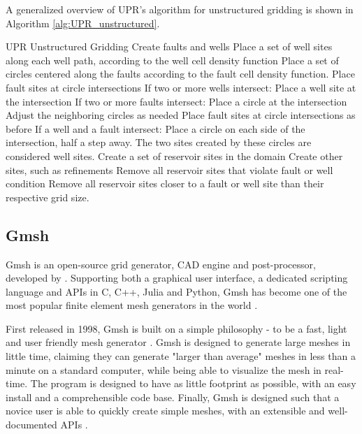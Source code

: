 A generalized overview of UPR's algorithm for unstructured gridding \cite[pp.51]{UPR_thesis} is shown in Algorithm \ref{alg:UPR_unstructured}.
\begin{pseudocode}[float=ht,label=alg:UPR_unstructured]{UPR Unstructured Gridding}
Create faults and wells
    Place a set of well sites along each well path, according to the well cell density function
    Place a set of circles centered along the faults according to the fault cell density function. Place fault sites at circle intersections
    If two or more wells intersect:
        Place a well site at the intersection
    If two or more faults intersect:
        Place a circle at the intersection
        Adjust the neighboring circles as needed
        Place fault sites at circle intersections as before
    If a well and a fault intersect:
        Place a circle on each side of the intersection, half a step away. The two sites created by these circles are considered well sites.
Create a set of reservoir sites in the domain
Create other sites, such as refinements
Remove all reservoir sites that violate fault or well condition
Remove all reservoir sites closer to a fault or well site than their respective grid size.
\end{pseudocode}

\subsection{Gmsh}
\label{sec:Gmsh}
Gmsh is an open-source grid generator, CAD engine and post-processor, developed by \textcite{Gmsh_article}. Supporting both a graphical user interface, a dedicated scripting language and APIs in C, C++, Julia and Python, Gmsh has become one of the most popular finite element mesh generators in the world \cite{Gmsh_presentation}.

First released in 1998, Gmsh is built on a simple philosophy - to be a fast, light and user friendly mesh generator \cite{Gmsh_article}. Gmsh is designed to generate large meshes in little time, claiming they can generate "larger than average" meshes in less than a minute on a standard computer, while being able to visualize the mesh in real-time. The program is designed to have as little footprint as possible, with an easy install and a comprehensible code base. Finally, Gmsh is designed such that a novice user is able to quickly create simple meshes, with an extensible and well-documented APIs \cite{Gmsh_presentation}.

